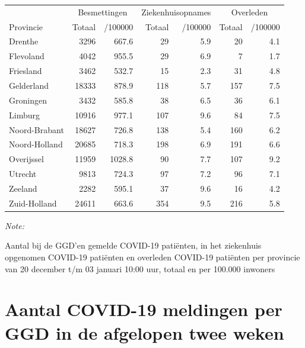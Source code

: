 \documentclass[
  english,
  man,floatsintext]{apa6}
\begin{document}
\begin{table}[H]
\centering
\begin{threeparttable}
\begin{tabular}{lrrrrrr}
\toprule
\multicolumn{1}{c}{ } & \multicolumn{2}{c}{Besmettingen} & \multicolumn{2}{c}{Ziekenhuisopnames} & \multicolumn{2}{c}{Overleden} \\
\cmidrule(l{3pt}r{3pt}){2-3} \cmidrule(l{3pt}r{3pt}){4-5} \cmidrule(l{3pt}r{3pt}){6-7}
Provincie & Totaal & /100000 & Totaal & /100000 & Totaal & /100000\\
\midrule
Drenthe & 3296 & 667.6 & 29 & 5.9 & 20 & 4.1\\
Flevoland & 4042 & 955.5 & 29 & 6.9 & 7 & 1.7\\
Friesland & 3462 & 532.7 & 15 & 2.3 & 31 & 4.8\\
Gelderland & 18333 & 878.9 & 118 & 5.7 & 157 & 7.5\\
Groningen & 3432 & 585.8 & 38 & 6.5 & 36 & 6.1\\
Limburg & 10916 & 977.1 & 107 & 9.6 & 84 & 7.5\\
Noord-Brabant & 18627 & 726.8 & 138 & 5.4 & 160 & 6.2\\
Noord-Holland & 20685 & 718.3 & 198 & 6.9 & 191 & 6.6\\
Overijssel & 11959 & 1028.8 & 90 & 7.7 & 107 & 9.2\\
Utrecht & 9813 & 724.3 & 97 & 7.2 & 96 & 7.1\\
Zeeland & 2282 & 595.1 & 37 & 9.6 & 16 & 4.2\\
Zuid-Holland & 24611 & 663.6 & 354 & 9.5 & 216 & 5.8\\
\bottomrule
\end{tabular}
\begin{tablenotes}
\item \textit{Note: } 
\item Aantal bij de GGD’en gemelde COVID-19 patiënten, in het ziekenhuis opgenomen COVID-19 patiënten en overleden COVID-19 patiënten per provincie van 20 december t/m 03 januari 10:00 uur, totaal en per 100.000 inwoners
\end{tablenotes}
\end{threeparttable}
\end{table}

\newpage

\hypertarget{aantal-covid-19-meldingen-per-ggd-in-de-afgelopen-twee-weken}{%
\section{Aantal COVID-19 meldingen per GGD in de afgelopen twee weken}\label{aantal-covid-19-meldingen-per-ggd-in-de-afgelopen-twee-weken}}
\end{document}
